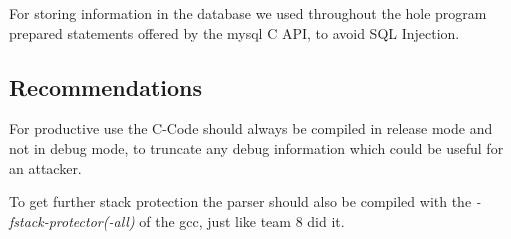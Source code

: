 For storing information in the database we used throughout the hole program prepared statements offered by the mysql C API, to avoid SQL Injection.

\subsection{Recommendations}

For productive use the C-Code should always be compiled in release mode and not in debug mode, to truncate any debug information which could be useful for an attacker.

To get further stack protection the parser should also be compiled with the \textit{-fstack-protector(-all)} of the gcc, just like team 8 did it. 
